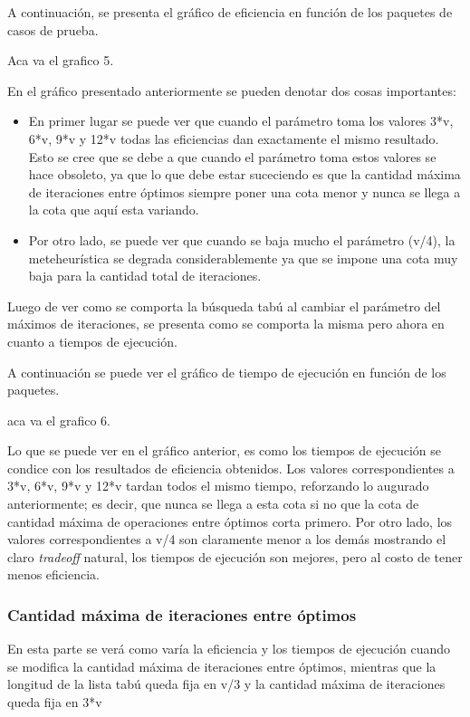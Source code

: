 \documentclass[a4paper,10pt]{article}
\begin{document}
A continuaci\'on, se presenta el gr\'afico de eficiencia en funci\'on de los paquetes de casos de prueba.

Aca va el grafico 5.


En el gr\'afico presentado anteriormente se pueden denotar dos cosas importantes:
\begin{itemize}
\item En primer lugar se puede ver que cuando el par\'ametro toma los valores 3*v, 6*v, 9*v y 12*v todas las eficiencias dan exactamente el mismo resultado. Esto se cree que se debe a que cuando el par\'ametro toma estos valores se hace obsoleto, ya que lo que debe estar suceciendo es que la cantidad m\'axima de iteraciones entre \'optimos siempre poner una cota menor y nunca se llega a la cota que aqu\'i esta variando. 
\item Por otro lado, se puede ver que cuando se baja mucho el par\'ametro (v/4), la meteheur\'istica se degrada considerablemente ya que se impone una cota muy baja para la cantidad total de iteraciones.
\end{itemize}


Luego de ver como se comporta la b\'usqueda tab\'u al cambiar el par\'ametro del m\'aximos de iteraciones, se presenta como se comporta la misma pero ahora en cuanto a tiempos de ejecuci\'on.

A continuaci\'on se puede ver el gr\'afico de tiempo de ejecuci\'on en funci\'on de los paquetes.

aca va el grafico 6.

Lo que se puede ver en el gr\'afico anterior, es como los tiempos de ejecuci\'on se condice con los resultados de eficiencia obtenidos. Los valores correspondientes a 3*v, 6*v, 9*v y 12*v tardan todos el mismo tiempo, reforzando lo augurado anteriormente; es decir, que nunca se llega a esta cota si no que la cota de cantidad m\'axima de operaciones entre \'optimos corta primero. Por otro lado, los valores correspondientes a v/4 son claramente menor a los dem\'as mostrando el claro \emph{tradeoff} natural, los tiempos de ejecuci\'on son mejores, pero al costo de tener menos eficiencia.


\subsubsection*{Cantidad m\'axima de iteraciones entre \'optimos}

En esta parte se ver\'a como var\'ia la eficiencia y los tiempos de ejecuci\'on cuando se modifica la cantidad m\'axima de iteraciones entre \'optimos, mientras que la longitud de la lista tab\'u queda fija en v/3 y la cantidad m\'axima de iteraciones queda fija en 3*v
\end{document}
